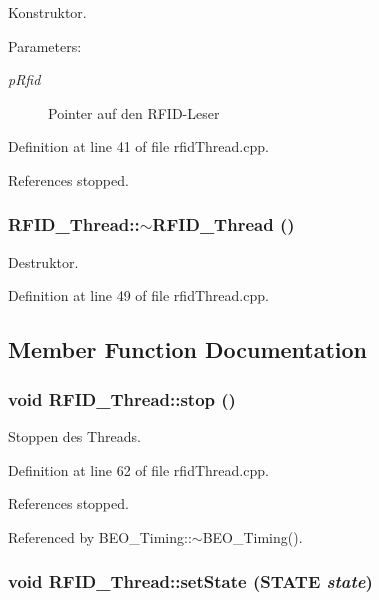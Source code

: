 Konstruktor. 

\begin{Desc}
\item[Parameters:]
\begin{description}
\item[{\em pRfid}]Pointer auf den RFID-Leser \end{description}
\end{Desc}


Definition at line 41 of file rfidThread.cpp.

References stopped.\hypertarget{class_r_f_i_d___thread_805943c4c19f9611d3e5c392d98072ed}{
\subsubsection[$\sim$RFID\_\-Thread]{\setlength{\rightskip}{0pt plus 5cm}RFID\_\-Thread::$\sim$RFID\_\-Thread ()}}
\label{class_r_f_i_d___thread_805943c4c19f9611d3e5c392d98072ed}


Destruktor. 



Definition at line 49 of file rfidThread.cpp.

\subsection{Member Function Documentation}
\hypertarget{class_r_f_i_d___thread_d6fe5c34ad7534b547970cbb1e3cdc78}{
\subsubsection[stop]{\setlength{\rightskip}{0pt plus 5cm}void RFID\_\-Thread::stop ()}}
\label{class_r_f_i_d___thread_d6fe5c34ad7534b547970cbb1e3cdc78}


Stoppen des Threads. 



Definition at line 62 of file rfidThread.cpp.

References stopped.

Referenced by BEO\_\-Timing::$\sim$BEO\_\-Timing().\hypertarget{class_r_f_i_d___thread_d7b71a78a4c22c00d384327101166086}{
\subsubsection[setState]{\setlength{\rightskip}{0pt plus 5cm}void RFID\_\-Thread::setState ({\bf STATE} {\em state})}}
\label{class_r_f_i_d___thread_d7b71a78a4c22c00d384327101166086}


